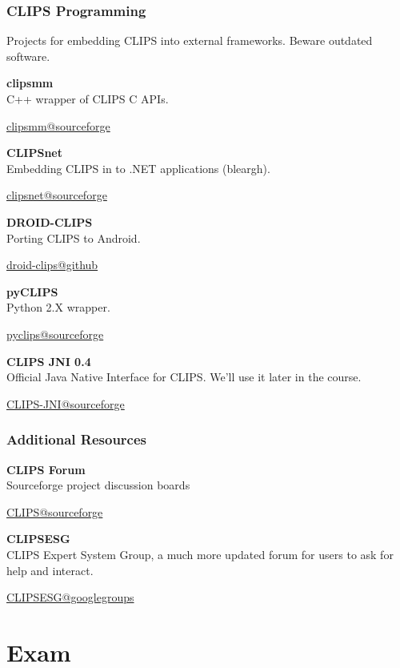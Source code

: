 \documentclass[xcolor={usenames,dvipsnames,svgnames}, compress]{beamer}
\begin{document}
  \begin{frame}
    \frametitle{CLIPS Programming}
    Projects for embedding CLIPS into external
    frameworks. Beware outdated software.\par\bigskip
    
    \textbf{clipsmm}\\
    C++ wrapper of CLIPS C APIs.
    \begin{flushright}
      \vspace{-20pt}
      \href{http://clipsmm.sourceforge.net/}{clipsmm@sourceforge}
    \end{flushright}
    \textbf{CLIPSnet}\\
    Embedding CLIPS in to .NET applications (bleargh).
    \begin{flushright}
      \vspace{-20pt}
      \href{http://sourceforge.net/projects/clipsnet/}{clipsnet@sourceforge}
    \end{flushright}
    \textbf{DROID-CLIPS}\\
    Porting CLIPS to Android.
    \begin{flushright}
      \vspace{-20pt}
      \href{https://github.com/DrItanium/DROID-CLIPS}{droid-clips@github}
    \end{flushright}
    \textbf{pyCLIPS}\\
    Python 2.X wrapper.
    \begin{flushright}
      \vspace{-20pt}
      \href{http://pyclips.sourceforge.net/web/}{pyclips@sourceforge}
    \end{flushright}
    \textbf{CLIPS JNI 0.4}\\
    Official Java Native Interface for CLIPS. We'll use it later in the course.
    \begin{flushright}
      \vspace{-5pt}
      \href{http://clipsrules.sourceforge.net/CLIPSJNIBeta.html}{CLIPS-JNI@sourceforge}
    \end{flushright}
  \end{frame}

  \begin{frame}
    \frametitle{Additional Resources}

    \textbf{CLIPS Forum}\\
    Sourceforge project discussion boards
    \begin{flushright}
      \vspace{-5pt}
      \href{http://sourceforge.net/p/clipsrules/discussion/}{CLIPS@sourceforge}
    \end{flushright}

    
    \textbf{CLIPSESG}\\
    CLIPS Expert System Group, a much more updated forum for users to
    ask for help and interact.
    \begin{flushright}
      \vspace{-5pt}
      \href{https://groups.google.com/forum/\#!forum/CLIPSESG}{CLIPSESG@googlegroups}
    \end{flushright}
    
  \end{frame}

  \section{Exam}
  {
    \begin{frame}
      \sectionpage
    \end{frame}
  }
\end{document}
